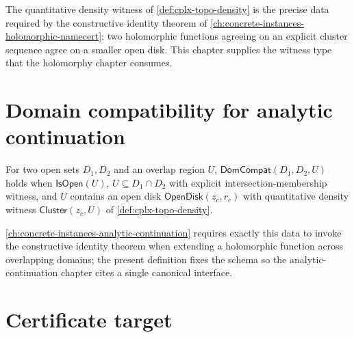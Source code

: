 \begin{remark}
The quantitative density witness of \autoref{def:cplx-topo-density} is the precise data required by the constructive identity theorem of \autoref{ch:concrete-instances-holomorphic-namecert}: two holomorphic functions agreeing on an explicit cluster sequence agree on a smaller open disk. This chapter supplies the witness type that the holomorphy chapter consumes.
\end{remark}

\section{Domain compatibility for analytic continuation}
\label{sec:cplx-topo-domain-compat}

\begin{definition}
\label{def:cplx-topo-domain-compat}
For two open sets \(D_1, D_2\) and an overlap region \(U\), \(\mathsf{DomCompat}(D_1, D_2, U)\) holds when \(\mathsf{IsOpen}(U)\), \(U \subseteq D_1 \cap D_2\) with explicit intersection-membership witness, and \(U\) contains an open disk \(\mathsf{OpenDisk}(z_c, r_c)\) with quantitative density witness \(\mathsf{Cluster}(z_c, U)\) of \autoref{def:cplx-topo-density}.
\end{definition}

\begin{remark}
\autoref{ch:concrete-instances-analytic-continuation} requires exactly this data to invoke the constructive identity theorem when extending a holomorphic function across overlapping domains; the present definition fixes the schema so the analytic-continuation chapter cites a single canonical interface.
\end{remark}

\section{Certificate target}
\label{sec:cplx-topo-cert-target}

